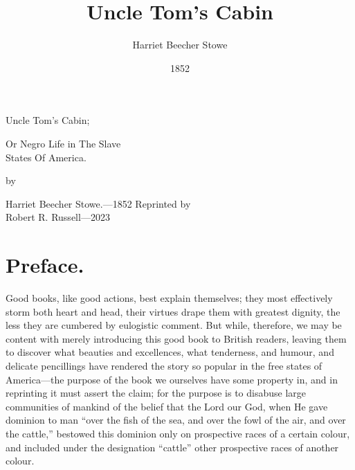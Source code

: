 \title{Uncle Tom's Cabin}
\author{Harriet Beecher Stowe}
\date{1852}
\begin{titlepage}
    \begin{center}
        \vspace*{1in}
        {\Huge Uncle Tom's Cabin;\par}
        {\large Or Negro Life in The Slave\\ States Of America.\par}
        {\large by\par}
        {\huge Harriet Beecher Stowe.---1852}
        \vfill
        {\large Reprinted by\\ Robert R. Russell---2023}
    \end{center}
\end{titlepage}

\cleardoublepage{}

\tableofcontents




\chapter{Preface.}

Good books, like good actions, best explain themselves; they most effectively
storm both heart and head, their virtues drape them with greatest dignity, the
less they are cumbered by eulogistic comment. But while, therefore, we may be
content with merely introducing this good book to British readers, leaving them
to discover what beauties and excellences, what tenderness, and humour, and
delicate pencillings have rendered the story so popular in the free states of
America---the purpose of the book we ourselves have some property in, and in
reprinting it must assert the claim; for the purpose is to disabuse large
communities of mankind of the belief that the Lord our God, when He gave
dominion to man ``over the fish of the sea, and over the fowl of the air, and
over the cattle,'' bestowed this dominion only on prospective races of a certain
colour, and included under the designation ``cattle'' other prospective races of
another colour.

